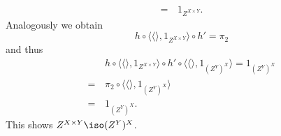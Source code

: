 \begin{answer}
\begin{itemize}
\begin{align*}
                =\, & 1_{Z^{X \times Y}}.
            \end{align*}
            Analogously we obtain
            \[ h \circ \langle \langle\rangle, 1_{Z^{X \times Y}} \rangle \circ h' = \pi_2 \]
            and thus
            \begin{align*}
                & h \circ \langle \langle\rangle, 1_{Z^{X \times Y}} \rangle \circ h' \circ \langle\langle\rangle, 1_{(Z^Y)^X}\rangle = 1_{(Z^Y)^X} \\
                =\, & \pi_2 \circ \langle\langle\rangle, 1_{(Z^Y)^X}\rangle \\
                =\, & 1_{(Z^Y)^X}.
            \end{align*}
            This shows $Z^{X \times Y} \iso (Z^Y)^X$.
    \end{itemize}
\end{answer}

